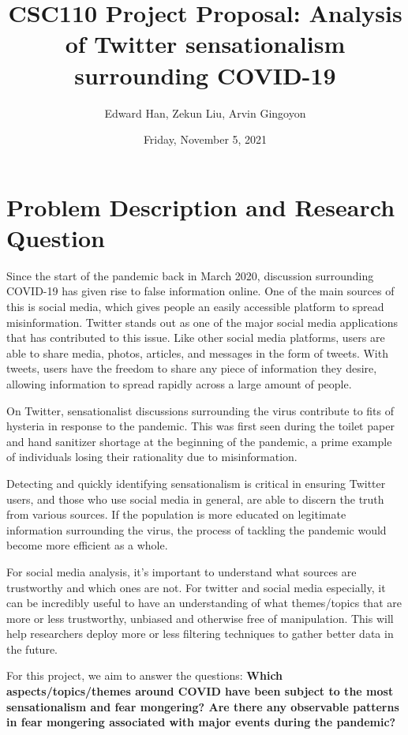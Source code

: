 \documentclass[fontsize=11pt]{article}
\title{CSC110 Project Proposal: Analysis of Twitter sensationalism surrounding COVID-19}
\author{Edward Han, Zekun Liu, Arvin Gingoyon}
\date{Friday, November 5, 2021}
\begin{document}
\maketitle

\section*{Problem Description and Research Question}

Since the start of the pandemic back in March 2020, discussion surrounding COVID-19 has given rise to false information online. One of the main sources of this is social media, which gives people an easily accessible platform to spread misinformation. Twitter stands out as one of the major social media applications that has contributed to this issue. Like other social media platforms, users are able to share media, photos, articles, and messages in the form of tweets. With tweets, users have the freedom to share any piece of information they desire, allowing information to spread rapidly across a large amount of people.

On Twitter, sensationalist discussions surrounding the virus contribute to fits of hysteria in response to the pandemic. This was first seen during the toilet paper and hand sanitizer shortage at the beginning of the pandemic, a prime example of individuals losing their rationality due to misinformation.

Detecting and quickly identifying sensationalism is critical in ensuring Twitter users, and those who use social media in general, are able to discern the truth from various sources. If the population is more educated on legitimate information surrounding the virus, the process of tackling the pandemic would become more efficient as a whole.

For social media analysis, it’s important to understand what sources are trustworthy and which ones are not. For twitter and social media especially, it can be incredibly useful to have an understanding of what themes/topics that are more or less trustworthy, unbiased and otherwise free of manipulation. This will help researchers deploy more or less filtering techniques to gather better data in the future.

For this project, we aim to answer the questions: \textbf{Which aspects/topics/themes around COVID have been subject to the most sensationalism and fear mongering? Are there any observable patterns in fear mongering associated with major events during the pandemic?}
\end{document}
